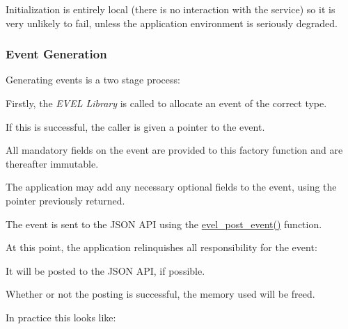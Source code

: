 Initialization is entirely local (there is no interaction with the service) so it is very unlikely to fail, unless the application environment is seriously degraded.\hypertarget{quickstart_qs_generate}{}\subsubsection{Event Generation}\label{quickstart_qs_generate}
Generating events is a two stage process\+:


\begin{DoxyEnumerate}
\item Firstly, the {\itshape E\+V\+EL Library} is called to allocate an event of the correct type.
\begin{DoxyItemize}
\item If this is successful, the caller is given a pointer to the event.
\item All mandatory fields on the event are provided to this factory function and are thereafter immutable.
\item The application may add any necessary optional fields to the event, using the pointer previously returned.
\end{DoxyItemize}
\item The event is sent to the J\+S\+ON A\+PI using the \hyperlink{evel_8h_a209d2e5dbffe9e11ac79ae140f4a81bd}{evel\+\_\+post\+\_\+event()} function.
\begin{DoxyItemize}
\item At this point, the application relinquishes all responsibility for the event\+:
\begin{DoxyItemize}
\item It will be posted to the J\+S\+ON A\+PI, if possible.
\item Whether or not the posting is successful, the memory used will be freed.
\end{DoxyItemize}
\end{DoxyItemize}
\end{DoxyEnumerate}

In practice this looks like\+:


